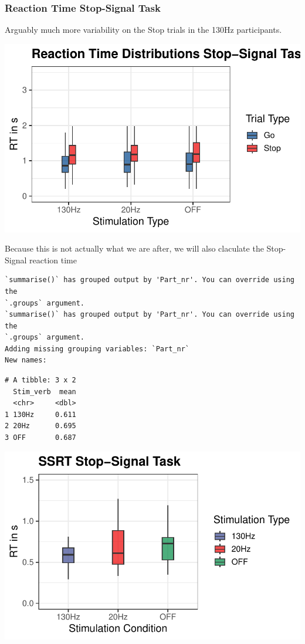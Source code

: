 \documentclass[
  letterpaper,
  DIV=11,
  numbers=noendperiod]{scrartcl}
\begin{document}
\hypertarget{reaction-time-stop-signal-task}{%
\subsubsection{Reaction Time Stop-Signal
Task}\label{reaction-time-stop-signal-task}}

Arguably much more variability on the Stop trials in the 130Hz
participants.

\includegraphics{MF_01_Modelfree_Analysis_files/figure-pdf/unnamed-chunk-5-1.pdf}

Because this is not actually what we are after, we will also claculate
the Stop-Signal reaction time

\begin{verbatim}
`summarise()` has grouped output by 'Part_nr'. You can override using the
`.groups` argument.
`summarise()` has grouped output by 'Part_nr'. You can override using the
`.groups` argument.
Adding missing grouping variables: `Part_nr`
New names:
\end{verbatim}

\begin{verbatim}
# A tibble: 3 x 2
  Stim_verb  mean
  <chr>     <dbl>
1 130Hz     0.611
2 20Hz      0.695
3 OFF       0.687
\end{verbatim}

\includegraphics{MF_01_Modelfree_Analysis_files/figure-pdf/unnamed-chunk-6-1.pdf}
\end{document}
